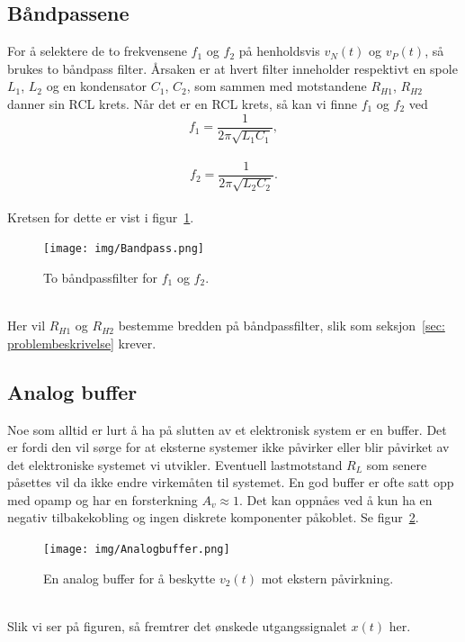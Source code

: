 \documentclass[a4paper,11pt,norsk]{article}
\begin{document}
\subsection{Båndpassene}\label{sec: bandpassene}
For å selektere de to frekvensene $f_1$ og $f_2$ på henholdsvis $v_N(t)$ og $v_P(t)$, så brukes to båndpass filter. Årsaken er at hvert filter inneholder respektivt en spole $L_{1}$, $L_2$ og en kondensator $C_{1}$, $C_2$, som sammen med motstandene $R_{H1}$, $R_{H2}$ danner sin RCL krets. Når det er en RCL krets, så kan vi finne $f_{1}$ og $f_{2}$ ved
\begin{equation}\label{eq: f_1}
    f_{1} = \frac{1}{2\pi \sqrt{L_{1} C_1}}, 
\end{equation}\\
\begin{equation}\label{eq: f_2}
    f_{2} = \frac{1}{2\pi \sqrt{L_2 C_2}} .
\end{equation}\\
Kretsen for dette er vist i figur~\ref{fig: bandpassfilter}.
\newpage
\begin{figure}[!htbp]
    \centering
    \texttt{[image: img/Bandpass.png]}
    \caption{To båndpassfilter for $f_1$ og $f_2$.}
    \label{fig: bandpassfilter}
\end{figure} \\
Her vil $R_{H1}$ og $R_{H2}$ bestemme bredden på båndpassfilter, slik som seksjon~\ref{sec: problembeskrivelse} krever.
\newpage
\subsection{Analog buffer}\label{sec: analog buffer}
Noe som alltid er lurt å ha på slutten av et elektronisk system er en buffer. Det er fordi den vil sørge for at eksterne systemer ikke påvirker eller blir påvirket av det elektroniske systemet vi utvikler. Eventuell lastmotstand $R_L$ som senere påsettes vil da ikke endre virkemåten til systemet. En god buffer er ofte satt opp med opamp og har en forsterkning $A_v \approx 1$. Det kan oppnåes ved å kun ha en negativ tilbakekobling og ingen diskrete komponenter påkoblet. Se figur~\ref{fig: analog buffer}.
\begin{figure}[!htbp]
    \centering
    \texttt{[image: img/Analogbuffer.png]}
    \caption{En analog buffer for å beskytte $v_2(t)$ mot ekstern påvirkning.}
    \label{fig: analog buffer}
\end{figure} \\
Slik vi ser på figuren, så fremtrer det ønskede utgangssignalet $x(t)$ her.
\end{document}

